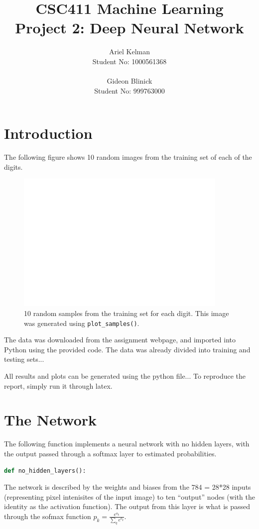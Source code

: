 \documentclass{article}
\title{CSC411 Machine Learning \\ Project 2: Deep Neural Network}
\author{ Ariel Kelman \\ Student No: 1000561368
         \\ \\
         Gideon Blinick \\ Student No: 999763000 }
\begin{document}
   \maketitle{}


   \section{Introduction}
   The following figure shows 10 random images from the training set of each of the digits.
   \begin{figure}[H] \centering
      \includegraphics[width=4in]{resources/part1}
      \caption{10 random samples from the training set for each digit. This image
         was generated using \texttt{plot\_samples()}. }
   \end{figure}
   The data was downloaded from the assignment webpage, and imported into Python using the
   provided code. The data was already divided into training and testing sets...

   All results and plots can be generated using the python file...
   To reproduce the report, simply run it through latex.


   \section{The Network}
   The following function implements a neural network with no hidden layers, with the
   output passed through a softmax layer to estimated probabilities.

   \begin{lstlisting}[language=Python]
      def no_hidden_layers():
   \end{lstlisting}

   The network is described by the weights and biases from the 784 = 28*28 inputs
   (representing pixel intenisites of the input image) to ten ``output'' nodes
   (with the identity as the activation function). The output from this layer is what is
   passed through the sofmax function $p_k = \frac{ e^{o_k} }{ \sum_q e^{o_q}}$.
\end{document}
